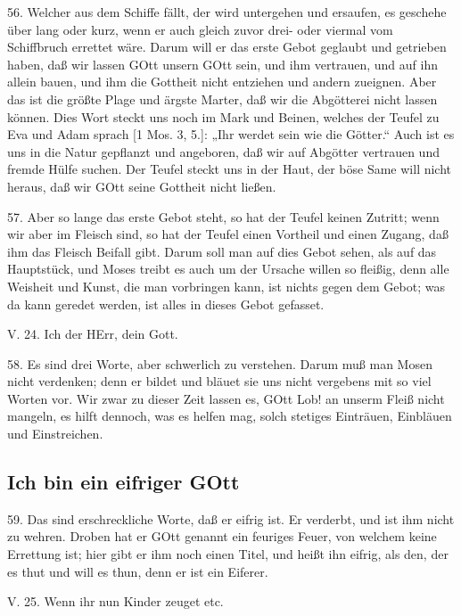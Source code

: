 56. Welcher aus dem Schiffe fällt, der wird untergehen und ersaufen, es geschehe über lang oder kurz, wenn er auch gleich zuvor drei- oder viermal vom Schiffbruch errettet wäre. Darum will er das erste Gebot geglaubt und getrieben haben, daß wir lassen GOtt unsern GOtt sein, und ihm vertrauen, und auf ihn allein bauen, und ihm die Gottheit nicht entziehen und andern zueignen. Aber das ist die größte Plage und ärgste Marter, daß wir die Abgötterei nicht lassen können. Dies Wort steckt uns noch im Mark und Beinen, welches der Teufel zu Eva und Adam sprach [1 Mos. 3, 5.]: „Ihr werdet sein wie die Götter.“ Auch ist es uns in die Natur gepflanzt und angeboren, daß wir auf Abgötter vertrauen und fremde Hülfe suchen. Der Teufel steckt uns in der Haut, der böse Same will nicht heraus, daß wir GOtt seine Gottheit nicht ließen.

57. Aber so lange das erste Gebot steht, so hat der Teufel keinen Zutritt; wenn wir aber im Fleisch sind, so hat der Teufel einen Vortheil und einen Zugang, daß ihm das Fleisch Beifall gibt. Darum soll man auf dies Gebot sehen, als auf das Hauptstück, und Moses treibt es auch um der Ursache willen so fleißig, denn alle Weisheit und Kunst, die man vorbringen kann, ist nichts gegen dem Gebot; was da kann geredet werden, ist alles in dieses Gebot gefasset.

\begin{schriftzitat}
V. 24. Ich der HErr, dein Gott.
\end{schriftzitat}

58. Es sind drei Worte, aber schwerlich zu verstehen. Darum muß man Mosen nicht verdenken; denn er bildet und bläuet sie uns nicht vergebens mit so viel Worten vor. Wir zwar zu dieser Zeit lassen es, GOtt Lob! an unserm Fleiß nicht mangeln, es hilft dennoch, was es helfen mag, solch stetiges Einträuen, Einbläuen und Einstreichen.

\subsection{Ich bin ein eifriger GOtt}

59. Das sind erschreckliche Worte, daß er eifrig ist. Er verderbt, und ist ihm nicht zu wehren. Droben hat er GOtt genannt ein feuriges Feuer, von welchem keine Errettung ist; hier gibt er ihm noch einen Titel, und heißt ihn eifrig, als den, der es thut und will es thun, denn er ist ein Eiferer.

\begin{schriftzitat}
V. 25. Wenn ihr nun Kinder zeuget etc.
\end{schriftzitat}

